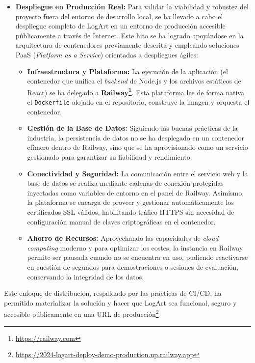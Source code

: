 \begin{itemize}
\begin{itemize}
        \end{itemize}
        \vspace{0.3cm}
        \item \textbf{Despliegue en Producción Real:}
    \label{ssec:despliegueProduccion}
    Para validar la viabilidad y robustez del proyecto fuera del entorno de desarrollo local, se ha llevado a cabo el despliegue completo de LogArt en un entorno de producción accesible públicamente a través de Internet. Este hito se ha logrado apoyándose en la arquitectura de contenedores previamente descrita y empleando soluciones PaaS (\textit{Platform as a Service}) orientadas a despliegues ágiles:
        \begin{itemize}
            \item \textbf{Infraestructura y Plataforma:} La ejecución de la aplicación (el contenedor que unifica el \textit{backend} de Node.js y los archivos estáticos de React) se ha delegado a \textbf{Railway\footnote{\url{https://railway.com}}}. Esta plataforma lee de forma nativa el \texttt{Dockerfile} alojado en el repositorio, construye la imagen y orquesta el contenedor.
            \item \textbf{Gestión de la Base de Datos:} Siguiendo las buenas prácticas de la industria, la persistencia de datos no se ha desplegado en un contenedor efímero dentro de Railway, sino que se ha aprovisionado como un servicio gestionado para garantizar su fiabilidad y rendimiento.
            \item \textbf{Conectividad y Seguridad:} La comunicación entre el servicio web y la base de datos se realiza mediante cadenas de conexión protegidas inyectadas como variables de entorno en el panel de Railway. Asimismo, la plataforma se encarga de proveer y gestionar automáticamente los certificados SSL válidos, habilitando tráfico HTTPS sin necesidad de configuración manual de claves criptográficas en el contenedor.
            \item \textbf{Ahorro de Recursos:} Aprovechando las capacidades de \textit{cloud computing} moderno y para optimizar los costes, la instancia en Railway permite ser pausada cuando no se encuentra en uso, pudiendo reactivarse en cuestión de segundos para demostraciones o sesiones de evaluación, conservando la integridad de los datos.
        \end{itemize}
\end{itemize}

Este enfoque de distribución, respaldado por las prácticas de CI/CD, ha permitido materializar la solución y hacer que LogArt sea funcional, seguro y accesible públicamente en una URL de producción\footnote{\url{https://2024-logart-deploy-demo-production.up.railway.app}}


